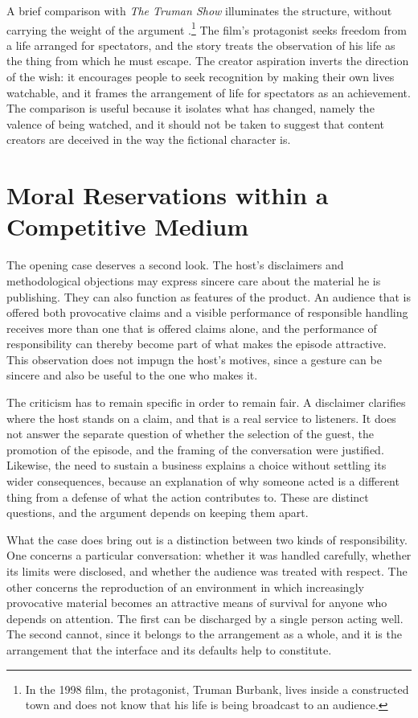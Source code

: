 \documentclass[12pt]{article}
\theoremstyle{plain}
\theoremstyle{definition}
\begin{document}
A brief comparison with \emph{The Truman Show} illuminates the structure, without carrying the weight of the argument \cite{weir1998}.\footnote{In the 1998 film, the protagonist, Truman Burbank, lives inside a constructed town and does not know that his life is being broadcast to an audience.} The film's protagonist seeks freedom from a life arranged for spectators, and the story treats the observation of his life as the thing from which he must escape. The creator aspiration inverts the direction of the wish: it encourages people to seek recognition by making their own lives watchable, and it frames the arrangement of life for spectators as an achievement. The comparison is useful because it isolates what has changed, namely the valence of being watched, and it should not be taken to suggest that content creators are deceived in the way the fictional character is.

\section{Moral Reservations within a Competitive Medium}

The opening case deserves a second look. The host's disclaimers and methodological objections may express sincere care about the material he is publishing. They can also function as features of the product. An audience that is offered both provocative claims and a visible performance of responsible handling receives more than one that is offered claims alone, and the performance of responsibility can thereby become part of what makes the episode attractive. This observation does not impugn the host's motives, since a gesture can be sincere and also be useful to the one who makes it.

The criticism has to remain specific in order to remain fair. A disclaimer clarifies where the host stands on a claim, and that is a real service to listeners. It does not answer the separate question of whether the selection of the guest, the promotion of the episode, and the framing of the conversation were justified. Likewise, the need to sustain a business explains a choice without settling its wider consequences, because an explanation of why someone acted is a different thing from a defense of what the action contributes to. These are distinct questions, and the argument depends on keeping them apart.

What the case does bring out is a distinction between two kinds of responsibility. One concerns a particular conversation: whether it was handled carefully, whether its limits were disclosed, and whether the audience was treated with respect. The other concerns the reproduction of an environment in which increasingly provocative material becomes an attractive means of survival for anyone who depends on attention. The first can be discharged by a single person acting well. The second cannot, since it belongs to the arrangement as a whole, and it is the arrangement that the interface and its defaults help to constitute.
\end{document}
